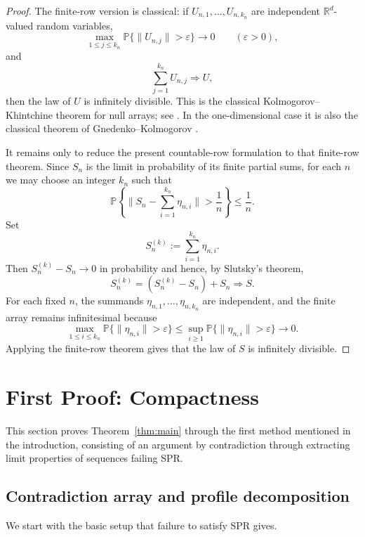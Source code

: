 \documentclass[11pt]{amsart}
\numberwithin{equation}{section}
\theoremstyle{definition}
\theoremstyle{remark}
\newcommand{\Prob}{\mathbb P}
\newcommand{\R}{\mathbb R}
\newcommand{\eps}{\varepsilon}
\newcommand{\norm}[1]{\lVert #1 \rVert}
\begin{document}
\begin{proof}
The finite-row version is classical: if
$U_{n,1},\dots,U_{n,k_n}$ are independent $\R^d$-valued random variables,
\[
\max_{1\le j\le k_n}\Prob\{\norm{U_{n,j}}>\eps\}\longrightarrow0
\qquad(\eps>0),
\]
and
\[
\sum_{j=1}^{k_n}U_{n,j}\Rightarrow U,
\]
then the law of $U$ is infinitely divisible.  This is the classical
Kolmogorov--Khintchine theorem for null arrays; see
\cite[Theorem~9.3]{sato-levy}.  In the one-dimensional case it is also the
classical theorem of Gnedenko--Kolmogorov
\cite[Chapter~IV, Section~24]{gnedenko-kolmogorov}.

It remains only to reduce the present countable-row formulation to that
finite-row theorem.  Since $S_n$ is the limit in probability of its finite
partial sums, for each $n$ we may choose an integer $k_n$ such that
\[
\Prob\left\{
\norm{S_n-\sum_{i=1}^{k_n}\eta_{n,i}}>\frac1n
\right\}\le \frac1n.
\]
Set
\[
S_n^{(k)}:=\sum_{i=1}^{k_n}\eta_{n,i}.
\]
Then $S_n^{(k)}-S_n\to0$ in probability and  hence, by Slutsky's theorem,
\[
S_n^{(k)} = (S_n^{(k)}-S_n)+S_n\Rightarrow S.
\]
For each fixed $n$, the summands $\eta_{n,1},\dots,\eta_{n,k_n}$ are independent,
and the finite array remains infinitesimal because
\[
\max_{1\le i\le k_n}\Prob\{\norm{\eta_{n,i}}>\eps\}
\le
\sup_{i\ge1}\Prob\{\norm{\eta_{n,i}}>\eps\}
\longrightarrow0.
\]
Applying the finite-row theorem gives that the law of $S$ is infinitely
divisible.
\end{proof}


\section{First Proof: Compactness}\label{sec:compactness-proof}

This section proves Theorem~\ref{thm:main} through the first method mentioned in the introduction, consisting of an argument by contradiction through extracting limit properties of sequences failing SPR. 

\subsection{Contradiction array and profile decomposition} We start with the basic setup that failure to satisfy SPR gives. 
\end{document}
